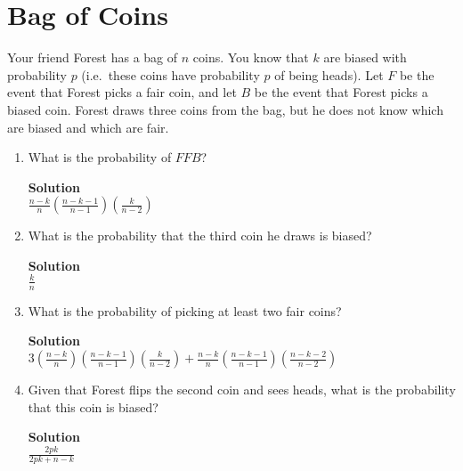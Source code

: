 \documentclass[11pt]{article}
\newcommand*{\Question}[1]{\section{#1}}
\newenvironment{Parts}{\begin{enumerate}[label=(\alph*)]}{\end{enumerate}}
\newcommand*{\Part}{\item}
\newenvironment{Answer}{\vspace{10pt}\begin{mdframed}\textbf{Solution}\\}{\end{mdframed}\vfill\pagebreak[3]}
\newenvironment{Answer}{\vspace{10pt}}{\vfill\pagebreak[3]}
\begin{document}
\Question{Bag of Coins}

Your friend Forest has a bag of $n$ coins. You know that $k$ are biased with
probability $p$ (i.e.\ these coins have probability $p$ of being heads). Let
$F$ be the event that Forest picks a fair coin, and let $B$ be the event that
Forest picks a biased coin. Forest draws three coins from the bag, but he does
not know which are biased and which are fair.

\begin{Parts}
\Part What is the probability of $FFB$?
\begin{Answer}
$\frac{n-k}{n}(\frac{n-k-1}{n-1})(\frac{k}{n-2})$
\end{Answer}

\Part What is the probability that the third coin he draws is biased?
\begin{Answer}
$\frac{k}{n}$
\end{Answer}

\Part What is the probability of picking at least two fair coins?
\begin{Answer}
$3(\frac{n-k}{n})(\frac{n-k-1}{n-1})(\frac{k}{n-2})+\frac{n-k}{n}(\frac{n-k-1}{n-1})(\frac{n-k-2}{n-2})$
\end{Answer}

\Part Given that Forest flips the second coin and sees heads, what is the
probability that this coin is biased?
\begin{Answer}
$\frac{2pk}{2pk+n-k}$
\end{Answer}
\end{Parts}
\end{document}
